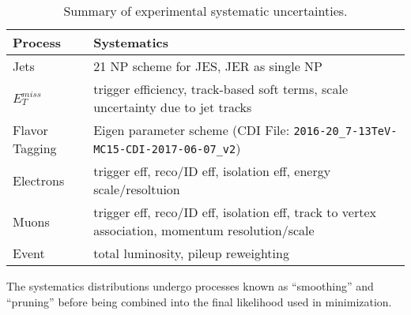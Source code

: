 \begin{table}[!htbp]
  \begin{center}
    \begin{tabular}{lp{5in}}
      \hline\hline
      Process & Systematics\\
      \hline
      Jets  & 21 NP scheme for JES, JER as single NP\\
      $E_T^{miss}$  & trigger efficiency, track-based soft terms, scale uncertainty due to jet tracks\\
      Flavor Tagging  & Eigen parameter scheme (CDI File: \texttt{2016-20\_7-13TeV-MC15-CDI-2017-06-07\_v2}) \\
      Electrons & trigger eff, reco/ID eff, isolation eff, energy scale/resoltuion\\
      Muons  & trigger eff, reco/ID eff, isolation eff, track to vertex association, momentum resolution/scale\\
      Event & total luminosity, pileup reweighting\\
      \hline\hline
    \end{tabular}
  \end{center}
  \caption{Summary of experimental systematic uncertainties.}
  \label{tab:expsys}
\end{table}

The systematics distributions undergo processes known as ``smoothing'' and ``pruning'' before being combined into the final likelihood used in minimization.

